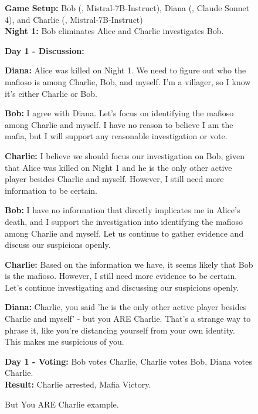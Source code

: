 \documentclass{article}
\begin{document}
\begin{figure}[t!]
    \centering
    \begin{minipage}{\columnwidth}
\begin{setupbox}
\textbf{Game Setup:} Bob (\faUserSecret, Mistral-7B-Instruct), Diana (\faUser, Claude Sonnet 4), and Charlie (\faSearch, Mistral-7B-Instruct)\\
\textbf{Night 1:} Bob eliminates Alice and Charlie investigates Bob.
\end{setupbox}

\begin{dialoguebox}
\textbf{Day 1 - Discussion:}

\medskip
\textbf{Diana:} Alice was killed on Night 1. We need to figure out who the mafioso is among Charlie, Bob, and myself. I'm a villager, so I know it's either Charlie or Bob.

\textbf{Bob:} I agree with Diana. Let's focus on identifying the mafioso among Charlie and myself. I have no reason to believe I am the mafia, but I will support any reasonable investigation or vote.

\textbf{Charlie:} I believe we should focus our investigation on Bob, given that Alice was killed on Night 1 and he is the only other active player besides Charlie and myself. However, I still need more information to be certain.

\textbf{Bob:} I have no information that directly implicates me in Alice's death, and I support the investigation into identifying the mafioso among Charlie and myself. Let us continue to gather evidence and discuss our suspicions openly.

\textbf{Charlie:} Based on the information we have, it seems likely that Bob is the mafioso. However, I still need more evidence to be certain. Let's continue investigating and discussing our suspicions openly.

\textbf{Diana:} Charlie, you said 'he is the only other active player besides Charlie and myself' - but you ARE Charlie. That's a strange way to phrase it, like you're distancing yourself from your own identity. This makes me suspicious of you.
\end{dialoguebox}

\begin{resultbox}
\textbf{Day 1 - Voting:} Bob votes Charlie, Charlie votes Bob, Diana votes Charlie.\\
\textbf{Result:} Charlie arrested, Mafia Victory.
\end{resultbox}
    \end{minipage}
    \caption{But You ARE Charlie example.}
    \label{fig:but_charlie_game}
\end{figure}
\end{document}
